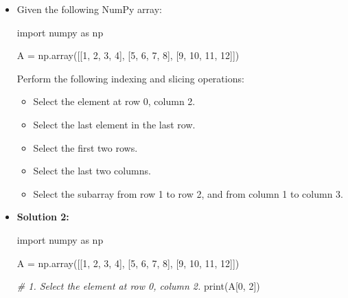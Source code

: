\documentclass[11pt]{article}
\providecommand{\tightlist}{%
      \setlength{\itemsep}{0pt}\setlength{\parskip}{0pt}}
\newenvironment{Shaded}{}{}
\newcommand{\DecValTok}[1]{\textcolor[rgb]{0.25,0.63,0.44}{{#1}}}
\newcommand{\CommentTok}[1]{\textcolor[rgb]{0.38,0.63,0.69}{\textit{{#1}}}}
\newcommand{\NormalTok}[1]{{#1}}
\newcommand{\ImportTok}[1]{{#1}}
\newcommand{\OperatorTok}[1]{\textcolor[rgb]{0.40,0.40,0.40}{{#1}}}
\newcommand{\BuiltInTok}[1]{{#1}}
\begin{document}
\begin{itemize}
\item
  Given the following NumPy array:

\begin{Shaded}
\begin{Highlighting}[]
\ImportTok{import}\NormalTok{ numpy }\ImportTok{as}\NormalTok{ np}

\NormalTok{A }\OperatorTok{=}\NormalTok{ np.array([[}\DecValTok{1}\NormalTok{, }\DecValTok{2}\NormalTok{, }\DecValTok{3}\NormalTok{, }\DecValTok{4}\NormalTok{],}
\NormalTok{          [}\DecValTok{5}\NormalTok{, }\DecValTok{6}\NormalTok{, }\DecValTok{7}\NormalTok{, }\DecValTok{8}\NormalTok{],}
\NormalTok{          [}\DecValTok{9}\NormalTok{, }\DecValTok{10}\NormalTok{, }\DecValTok{11}\NormalTok{, }\DecValTok{12}\NormalTok{]])}
\end{Highlighting}
\end{Shaded}

  Perform the following indexing and slicing operations:

  \begin{itemize}
  \tightlist
  \item
    Select the element at row 0, column 2.
  \item
    Select the last element in the last row.
  \item
    Select the first two rows.
  \item
    Select the last two columns.
  \item
    Select the subarray from row 1 to row 2, and from column 1 to column
    3.
  \end{itemize}
\item
  \textbf{Solution 2:}

\begin{Shaded}
\begin{Highlighting}[]
\ImportTok{import}\NormalTok{ numpy }\ImportTok{as}\NormalTok{ np}

\NormalTok{A }\OperatorTok{=}\NormalTok{ np.array([[}\DecValTok{1}\NormalTok{, }\DecValTok{2}\NormalTok{, }\DecValTok{3}\NormalTok{, }\DecValTok{4}\NormalTok{],}
\NormalTok{              [}\DecValTok{5}\NormalTok{, }\DecValTok{6}\NormalTok{, }\DecValTok{7}\NormalTok{, }\DecValTok{8}\NormalTok{],}
\NormalTok{              [}\DecValTok{9}\NormalTok{, }\DecValTok{10}\NormalTok{, }\DecValTok{11}\NormalTok{, }\DecValTok{12}\NormalTok{]])}

\CommentTok{\# 1. Select the element at row 0, column 2.}
\BuiltInTok{print}\NormalTok{(A[}\DecValTok{0}\NormalTok{, }\DecValTok{2}\NormalTok{])}


\end{Highlighting}
\end{Shaded}
\end{itemize}
\end{document}
